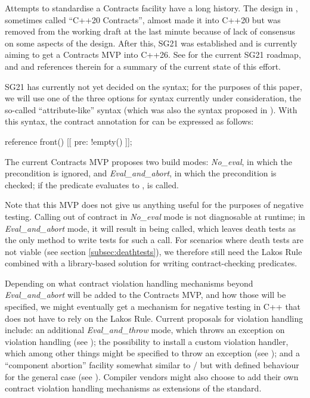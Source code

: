 Attempts to standardise a Contracts facility have a long history. The design in \cite{P0542R5}, sometimes called ``C++20 Contracts'', almost made it into C++20 but was removed from the working draft at the last minute because of lack of consensus on some aspects of the design. After this, SG21 was established and is currently aiming to get a Contracts MVP into C++26. See \cite{P2695R1} for the current SG21 roadmap, and \cite{P2521R3} and references therein for a summary of the current state of this effort.

SG21 has currently not yet decided on the syntax; for the purposes of this paper, we will use one of the three options for syntax currently under consideration, the so-called ``attribute-like'' syntax (which was also the syntax proposed in \cite{P0542R5}). With this syntax, the contract annotation for  can be expressed as follows:
\begin{codeblock}
reference front() [[ pre: !empty() ]];
\end{codeblock}

The current Contracts MVP proposes two build modes: \emph{No_eval}, in which the precondition is ignored, and \emph{Eval_and_abort}, in which the precondition is checked; if the predicate evaluates to ,  is called.

Note that this MVP does not give us anything useful for the purposes of negative testing. Calling  out of contract in \emph{No_eval} mode is not diagnosable at runtime; in \mbox{\emph{Eval_and_abort}} mode, it will result in  being called, which leaves death tests as the only method to write tests for such a call. For scenarios where death tests are not viable (see section \ref{subsec:deathtests}), we therefore still need the Lakos Rule combined with a library-based solution for writing contract-checking predicates.

Depending on what contract violation handling mechanisms beyond \mbox{\emph{Eval_and_abort}} will be added to the Contracts MVP, and how those will be specified, we might eventually get a mechanism for negative testing in C++ that does not have to rely on the Lakos Rule. Current proposals for violation handling include: an additional \emph{Eval_and_throw} mode, which throws an exception on violation handling (see \cite{P2698R0}); the possibility to install a custom violation handler, which among other things might be specified to throw an exception (see \cite{P2811R1}); and a ``component abortion'' facility somewhat similar to / but with defined behaviour for the general case (see \cite{P2784R0}). Compiler vendors might also choose to add their own contract violation handling mechanisms as extensions of the standard.

